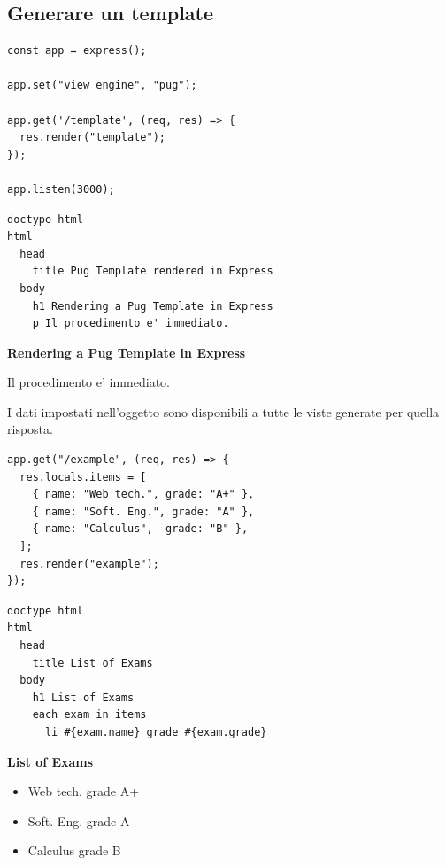 \subsection{Generare un template}

\begin{lstlisting}[style=js, name=index.js]
const app = express();

app.set("view engine", "pug");

app.get('/template', (req, res) => {
  res.render("template");
});

app.listen(3000);
\end{lstlisting}

\begin{affianco}[0.55][c]
\begin{lstlisting}[style=pug, name=views/template.pug]
doctype html
html
  head
    title Pug Template rendered in Express
  body
    h1 Rendering a Pug Template in Express
    p Il procedimento e' immediato.
\end{lstlisting}
\risultato
\begin{browser}
  {\raggedright\Lora\bfseries\LARGE Rendering a Pug Template in Express\par}\vspace{6pt}
  Il procedimento e' immediato.
\end{browser}
\end{affianco}

I dati impostati nell'oggetto  sono disponibili a tutte le
viste generate per quella risposta.

\begin{lstlisting}[style=js, name=locals.js]
app.get("/example", (req, res) => {
  res.locals.items = [
    { name: "Web tech.", grade: "A+" },
    { name: "Soft. Eng.", grade: "A" },
    { name: "Calculus",  grade: "B" },
  ];
  res.render("example");
});
\end{lstlisting}

\begin{affianco}[0.5][c]
\begin{lstlisting}[style=pug, name=views/example.pug]
doctype html
html
  head
    title List of Exams
  body
    h1 List of Exams
    each exam in items
      li #{exam.name} grade #{exam.grade}
\end{lstlisting}
\risultato
\begin{browser}
  {\Lora\bfseries\LARGE List of Exams}
  \begin{itemize}[leftmargin=1.8em, itemsep=0pt, topsep=4pt, parsep=0pt]
    \item Web tech. grade A+
    \item Soft. Eng. grade A
    \item Calculus grade B
  \end{itemize}
\end{browser}
\end{affianco}


